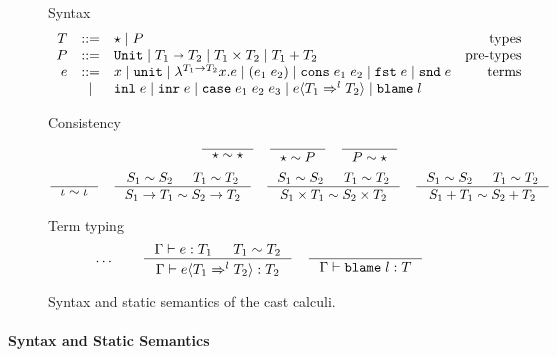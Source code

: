 \documentclass[acmsmall,review,anonymous]{acmart}\settopmatter{printfolios=true,printccs=false,printacmref=false}
\newcommand{\stxrule}[3]{#1 & ::= & #3 & \text{#2}\\}
\newcommand{\stxrulecont}[1]{& | & #1 & \\}
\newcommand{\plus}[0]{+}
\newcommand{\judgetype}[3]{#1 \vdash #2 : #3}
\newcommand{\POOunit}[0]{\mathtt{Unit}}
\newcommand{\POOfun}[2]{#1 \shortrightarrow #2}
\newcommand{\POOprod}[2]{#1 \times #2}
\newcommand{\POOsum}[2]{#1 \plus #2}
\newcommand{\eOOvar}[1]{#1}
\newcommand{\eOOsole}[0]{\mathtt{unit}}
\newcommand{\eOOlam}[4]{\lambda^{#1\rightarrow{}#2}#3.#4}
\newcommand{\eOOapp}[2]{(#1 \; #2)}
\newcommand{\eOOcons}[2]{\mathtt{cons} \; #1 \; #2}
\newcommand{\eOOcar}[1]{\mathtt{fst} \; #1}
\newcommand{\eOOcdr}[1]{\mathtt{snd} \; #1}
\newcommand{\eOOinl}[1]{\mathtt{inl} \; #1}
\newcommand{\eOOinr}[1]{\mathtt{inr} \; #1}
\newcommand{\eOOcase}[3]{\mathtt{case} \; #1 \; #2 \; #3}
\newcommand{\eOOcast}[4]{#1 \langle \cOOcast{#2}{#3}{#4} \rangle}
\newcommand{\eOOblame}[1]{\mathtt{blame} \; #1}
\newcommand{\cOOcast}[3]{#1 \Rightarrow^{#2} #3}
\begin{document}
\begin{figure}
  Syntax
  \[
  \begin{array}{rclr}
  \stxrule{T}{types}{
    \star \mid{}
    P
  }
  \stxrule{P}{pre-types}{
    \POOunit \mid
    \POOfun{T_1}{T_2} \mid
    \POOprod{T_1}{T_2} \mid
    \POOsum{T_1}{T_2}
  }
  \stxrule{e}{terms}{
    \eOOvar{x} \mid{}
    \eOOsole{} \mid{}
    \eOOlam{T_1}{T_2}{x}{e} \mid
    \eOOapp{e_1}{e_2} \mid
    \eOOcons{e_1}{e_2} \mid
    \eOOcar{e} \mid
    \eOOcdr{e}
  }
  \stxrulecont{
    \eOOinl{e} \mid
    \eOOinr{e} \mid
    \eOOcase{e_1}{e_2}{e_3} \mid
    \eOOcast{e}{T_1}{l}{T_2} \mid
    \eOOblame{l}
  }
  \end{array}
  \]
  
  Consistency
  \begin{gather*}
  \inference{}{
    \star \sim \star
  } \quad
  \inference{}{
    \star \sim P
  } \quad
  \inference{}{
    P \sim \star
  } \\[1ex]
  \inference{}{
    \iota \sim \iota
  } \quad
  \inference{
    S_1 \sim S_2 &
    T_1 \sim T_2
  }{
    S_1 \rightarrow T_1 \sim S_2 \rightarrow T_2
  } \quad
  \inference{
    S_1 \sim S_2 &
    T_1 \sim T_2
  }{
    S_1 \times T_1 \sim S_2 \times T_2
  } \quad
  \inference{
    S_1 \sim S_2 &
    T_1 \sim T_2
  }{
    S_1 \plus T_1 \sim S_2 \plus T_2
  }
  \end{gather*}
  
  Term typing
  \fbox{$\judgetype{\Gamma}{e}{T}$}
  \begin{gather*}
          \dots \qquad
    \inference{
      \Gamma \vdash e : T_1 & T_1 \sim T_2
    }{
      \judgetype{\Gamma}{\eOOcast{e}{T_1}{l}{T_2}}{T_2}
    } \quad
    \inference{
    }{
      \judgetype{\Gamma}{\eOOblame{l}}{T}
    }
  \end{gather*}
  
  \caption{Syntax and static semantics of the cast calculi.}
  \label{fig:blame-static}
\end{figure}


\paragraph{Syntax and Static Semantics}
\end{document}
